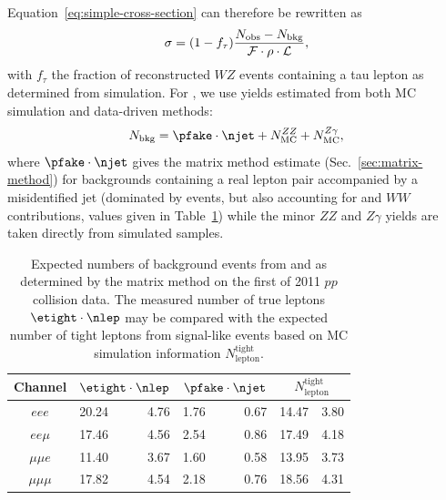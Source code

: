 Equation~\ref{eq:simple-cross-section} can therefore be rewritten as
\begin{equation}
\sigma = (1-f_{\tau})\frac{N_\mathrm{obs}-N_\mathrm{bkg}}{\mathcal{F} \cdot \rho \cdot \mathcal{L}},
\label{eq:x-sectionDef2}
\end{equation}
with $f_{\tau}$ the fraction of reconstructed $WZ$ events containing a tau lepton as determined from simulation.  For \nbkg, we use yields estimated from both MC simulation and data-driven methods:
\begin{equation}
  \nbkg = \pfake \cdot \njet + N_\text{MC}^{ZZ} + N_\text{MC}^{Z\gamma},
\end{equation}
where $\pfake \cdot \njet$ gives the matrix method estimate (Sec.~\ref{sec:matrix-method}) for backgrounds containing a real lepton pair accompanied by a misidentified jet (dominated by \Zjets events, but also accounting for \ttbar and $WW$ contributions, values given in Table~\ref{tab:xsec-matrix-results}) while the minor $ZZ$ and $Z\gamma$ yields are taken directly from simulated samples.

\begin{table}
  \newcommand{\sep}{$\,\pm\,$}
  \centering
  \begin{tabular}{c l@{\sep}r l@{\sep}r l@{\sep}r}
    \toprule
    Channel & \multicolumn{2}{c}{$\etight \cdot \nlep$} & \multicolumn{2}{c}{$\pfake\cdot\njet$} & \multicolumn{2}{c}{$N_\text{lepton}^\text{tight}$} \\
    \midrule
    ${e}{e}{e}$ & 20.24&4.76 & 1.76&0.67 & 14.47&3.80\\
    ${e}{e}\mu$ & 17.46&4.56 & 2.54&0.86 & 17.49&4.18\\
    $\mu\mu{e}$ & 11.40&3.67 & 1.60&0.58 & 13.95&3.73\\
    $\mu\mu\mu$ & 17.82&4.54 & 2.18&0.76 & 18.56&4.31\\
  \bottomrule
  \end{tabular}
  \caption[Results of the matrix method for background estimation]{Expected numbers of background events from \Zjets{} and \ttbar{} as determined by the matrix method on the first \earlylumi{} of 2011 $pp$ collision data.  The measured number of true leptons $\etight \cdot \nlep$ may be compared with the expected number of tight leptons from signal-like events based on MC simulation information $N_\text{lepton}^\text{tight}$.}
  \label{tab:xsec-matrix-results}
\end{table}

